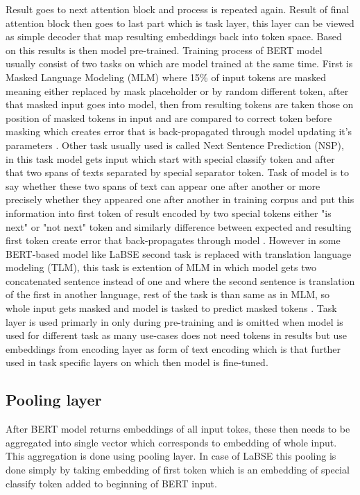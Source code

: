 Result goes to next attention block and process is repeated again. Result of final attention block then goes to last part which is task layer, this layer can be viewed as simple decoder that map resulting embeddings back into token space. Based on this results is then model pre-trained. Training process of BERT model usually consist of two tasks on which are model trained at the same time. First is Masked Language Modeling (MLM) where 15\% of input tokens are masked meaning either replaced by mask placeholder or by random different token, after that masked input goes into model, then from resulting tokens are taken those on position of masked tokens in input and are compared to correct token before masking which creates error that is back-propagated through model updating it's parameters \cite{bert_pretr_1}. Other task usually used is called Next Sentence Prediction (NSP), in this task model gets input which start with special classify token and after that two spans of texts separated by special separator token. Task of model is to say whether these two spans of text can appear one after another or more precisely whether they appeared one after another in training corpus and put this information into first token of result encoded by two special tokens either "is next" or "not next" token and similarly difference between expected and resulting first token create error that back-propagates through model \cite{bert_pretr_2}. However in some BERT-based model like LaBSE second task is replaced with translation language modeling (TLM), this task is extention of MLM in which model gets two concatenated sentence instead of one and where the second sentence is translation of the first in another language, rest of the task is than same as in MLM, so whole input gets masked and model is tasked to predict masked tokens \cite{bert_pretr_3}. Task layer is used primarly in only during pre-training and is omitted when model is used for different task as many use-cases does not need tokens in results but use embeddings from encoding layer as form of text encoding which is that further used in task specific layers on which then model is fine-tuned.

\subsection{Pooling layer}

After BERT model returns embeddings of all input tokes, these then needs to be aggregated into single vector which corresponds to embedding of whole input. This aggregation is done using pooling layer. In case of LaBSE this pooling is done simply by taking embedding of first token which is an embedding of special classify token added to beginning of BERT input.    

